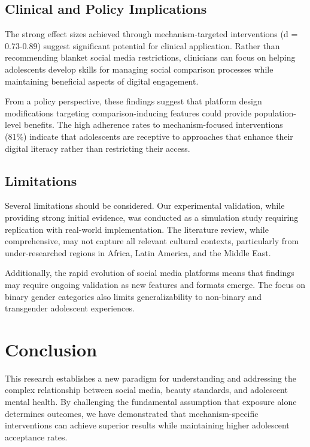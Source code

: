 \documentclass{article}
\begin{document}
\subsection{Clinical and Policy Implications}

The strong effect sizes achieved through mechanism-targeted interventions (d = 0.73-0.89) suggest significant potential for clinical application. Rather than recommending blanket social media restrictions, clinicians can focus on helping adolescents develop skills for managing social comparison processes while maintaining beneficial aspects of digital engagement.

From a policy perspective, these findings suggest that platform design modifications targeting comparison-inducing features could provide population-level benefits. The high adherence rates to mechanism-focused interventions (81\%) indicate that adolescents are receptive to approaches that enhance their digital literacy rather than restricting their access.

\subsection{Limitations}

Several limitations should be considered. Our experimental validation, while providing strong initial evidence, was conducted as a simulation study requiring replication with real-world implementation. The literature review, while comprehensive, may not capture all relevant cultural contexts, particularly from under-researched regions in Africa, Latin America, and the Middle East.

Additionally, the rapid evolution of social media platforms means that findings may require ongoing validation as new features and formats emerge. The focus on binary gender categories also limits generalizability to non-binary and transgender adolescent experiences.

\section{Conclusion}

This research establishes a new paradigm for understanding and addressing the complex relationship between social media, beauty standards, and adolescent mental health. By challenging the fundamental assumption that exposure alone determines outcomes, we have demonstrated that mechanism-specific interventions can achieve superior results while maintaining higher adolescent acceptance rates.
\end{document}
